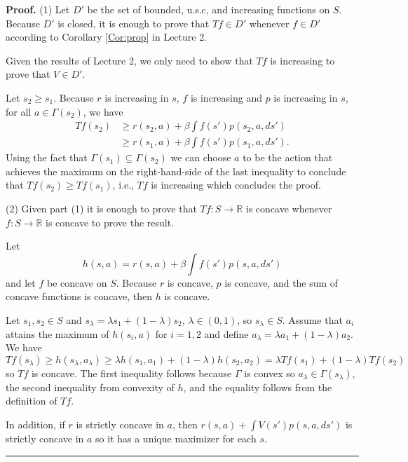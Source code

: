 \documentclass[letter,11pt]{article}
\newenvironment {proof}[1][Proof]{\noindent \textbf {#1.} }{\ \rule {0.5em}{0.5em}}
\begin{document}
\begin{proof}
    (1) Let $D'$ be the set of bounded, u.s.c, and increasing functions on $S$.  Because $D'$ is closed, it is enough to prove that $Tf \in D'$  whenever  $f \in D'$ according to Corollary \ref{Cor:prop} in Lecture 2.

    Given the results of Lecture 2, we only need to show that $Tf$ is increasing to prove that $V \in D'$.  

    Let $s_{2} \geq s_{1}$. Because $r$ is increasing in $s$, $f$ is increasing and $p$ is increasing in $s$, for all $a \in \Gamma(s_{2})$, we have 
    \begin{align*}
        Tf(s_{2}) & \geq  r(s_{2},a) + \beta \int f(s')p(s_{2},a,ds') \\
       & \geq r(s_{1},a) + \beta \int f(s')p(s_{1},a,ds').
    \end{align*}
Using the fact that $\Gamma(s_{1}) \subseteq \Gamma(s_{2})$ we can choose $a$ to be the action that achieves the maximum on the right-hand-side of the last inequality to conclude that $Tf(s_{2}) \geq Tf(s_{1})$, i.e., $Tf$ is increasing which concludes the proof.

(2) Given part (1) it is enough to prove that $Tf:S \rightarrow \mathbb{R} $ is concave whenever $f:S \rightarrow \mathbb{R}$ is concave to prove the result. 

Let $$h(s,a) = r(s,a)  + \beta \int f(s')p(s,a,ds') $$ and let $f$ be concave on $S$.  Because $r$ is concave, $p$ is concave, and the sum of concave functions is concave, then $h$ is concave. 

Let $s_{1},s_{2} \in S$ and $s_{\lambda} = \lambda s_{1} +(1-\lambda) s_{2}$, $\lambda \in (0,1)$, so $s_{\lambda} \in S$. Assume that $a_{i}$ attains the maximum of $h(s_{i},a)$ for $i=1,2$ and define $a_{\lambda} = \lambda a_{1} +(1-\lambda) a_{2}$. We have 
\begin{equation*}
    Tf(s_{\lambda }) \geq h(s_{\lambda},a_{\lambda}) \geq \lambda h(s_{1},a_{1}) + (1-\lambda)h(s_{2},a_{2}) = \lambda Tf(s_{1}) + (1-\lambda)Tf(s_{2})
    \end{equation*}
so $Tf$ is concave. The first inequality follows because $\Gamma$ is convex so $a_{\lambda} \in \Gamma (s_{\lambda})$, the second inequality from convexity of $h$, and the equality follows from the definition of $Tf$. 

 In addition, if $r$ is strictly concave in $a$, then $r(s,a) + \int V(s') p(s,a,ds')$ is strictly concave in $a$ so it has a unique maximizer for each $s$.   
\end{proof}
\end{document}
